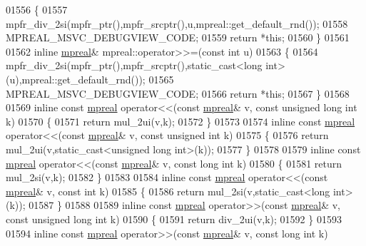 \begin{DoxyCode}
01556 \{
01557     mpfr\_div\_2si(mpfr\_ptr(),mpfr\_srcptr(),u,mpreal::get\_default\_rnd());
01558     MPREAL\_MSVC\_DEBUGVIEW\_CODE;
01559     \textcolor{keywordflow}{return} *\textcolor{keyword}{this};
01560 \}
01561 
01562 \textcolor{keyword}{inline} \hyperlink{classmpfr_1_1mpreal}{mpreal}& mpreal::operator>>=(\textcolor{keyword}{const} \textcolor{keywordtype}{int} u)
01563 \{
01564     mpfr\_div\_2si(mpfr\_ptr(),mpfr\_srcptr(),static\_cast<long int>(u),mpreal::get\_default\_rnd());
01565     MPREAL\_MSVC\_DEBUGVIEW\_CODE;
01566     \textcolor{keywordflow}{return} *\textcolor{keyword}{this};
01567 \}
01568 
01569 \textcolor{keyword}{inline} \textcolor{keyword}{const} \hyperlink{classmpfr_1_1mpreal}{mpreal} operator<<(\textcolor{keyword}{const} \hyperlink{classmpfr_1_1mpreal}{mpreal}& v, \textcolor{keyword}{const} \textcolor{keywordtype}{unsigned} \textcolor{keywordtype}{long} \textcolor{keywordtype}{int} k)
01570 \{
01571     \textcolor{keywordflow}{return} mul\_2ui(v,k);
01572 \}
01573 
01574 \textcolor{keyword}{inline} \textcolor{keyword}{const} \hyperlink{classmpfr_1_1mpreal}{mpreal} operator<<(\textcolor{keyword}{const} \hyperlink{classmpfr_1_1mpreal}{mpreal}& v, \textcolor{keyword}{const} \textcolor{keywordtype}{unsigned} \textcolor{keywordtype}{int} k)
01575 \{
01576     \textcolor{keywordflow}{return} mul\_2ui(v,static\_cast<unsigned long int>(k));
01577 \}
01578 
01579 \textcolor{keyword}{inline} \textcolor{keyword}{const} \hyperlink{classmpfr_1_1mpreal}{mpreal} operator<<(\textcolor{keyword}{const} \hyperlink{classmpfr_1_1mpreal}{mpreal}& v, \textcolor{keyword}{const} \textcolor{keywordtype}{long} \textcolor{keywordtype}{int} k)
01580 \{
01581     \textcolor{keywordflow}{return} mul\_2si(v,k);
01582 \}
01583 
01584 \textcolor{keyword}{inline} \textcolor{keyword}{const} \hyperlink{classmpfr_1_1mpreal}{mpreal} operator<<(\textcolor{keyword}{const} \hyperlink{classmpfr_1_1mpreal}{mpreal}& v, \textcolor{keyword}{const} \textcolor{keywordtype}{int} k)
01585 \{
01586     \textcolor{keywordflow}{return} mul\_2si(v,static\_cast<long int>(k));
01587 \}
01588 
01589 \textcolor{keyword}{inline} \textcolor{keyword}{const} \hyperlink{classmpfr_1_1mpreal}{mpreal} operator>>(\textcolor{keyword}{const} \hyperlink{classmpfr_1_1mpreal}{mpreal}& v, \textcolor{keyword}{const} \textcolor{keywordtype}{unsigned} \textcolor{keywordtype}{long} \textcolor{keywordtype}{int} k)
01590 \{
01591     \textcolor{keywordflow}{return} div\_2ui(v,k);
01592 \}
01593 
01594 \textcolor{keyword}{inline} \textcolor{keyword}{const} \hyperlink{classmpfr_1_1mpreal}{mpreal} operator>>(\textcolor{keyword}{const} \hyperlink{classmpfr_1_1mpreal}{mpreal}& v, \textcolor{keyword}{const} \textcolor{keywordtype}{long} \textcolor{keywordtype}{int} k)

\end{DoxyCode}
